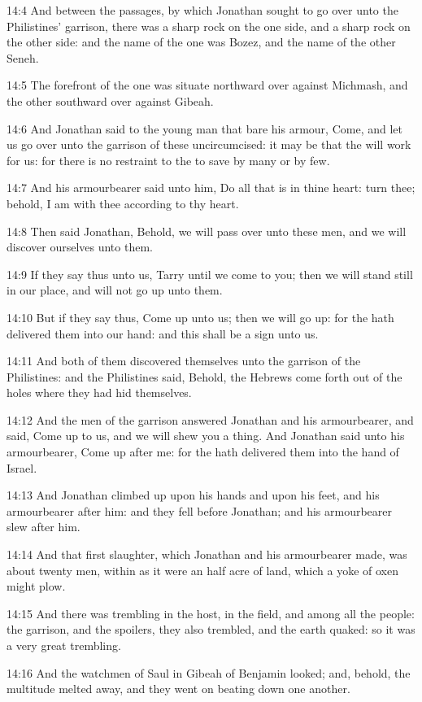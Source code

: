 14:4 And between the passages, by which Jonathan sought to go over
unto the Philistines' garrison, there was a sharp rock on the one
side, and a sharp rock on the other side: and the name of the one was
Bozez, and the name of the other Seneh.

14:5 The forefront of the one was situate northward over against
Michmash, and the other southward over against Gibeah.

14:6 And Jonathan said to the young man that bare his armour, Come,
and let us go over unto the garrison of these uncircumcised: it may be
that the \LORD will work for us: for there is no restraint to the \LORD
to save by many or by few.

14:7 And his armourbearer said unto him, Do all that is in thine
heart: turn thee; behold, I am with thee according to thy heart.

14:8 Then said Jonathan, Behold, we will pass over unto these men, and
we will discover ourselves unto them.

14:9 If they say thus unto us, Tarry until we come to you; then we
will stand still in our place, and will not go up unto them.

14:10 But if they say thus, Come up unto us; then we will go up: for
the \LORD hath delivered them into our hand: and this shall be a sign
unto us.

14:11 And both of them discovered themselves unto the garrison of the
Philistines: and the Philistines said, Behold, the Hebrews come forth
out of the holes where they had hid themselves.

14:12 And the men of the garrison answered Jonathan and his
armourbearer, and said, Come up to us, and we will shew you a thing.
And Jonathan said unto his armourbearer, Come up after me: for the
\LORD hath delivered them into the hand of Israel.

14:13 And Jonathan climbed up upon his hands and upon his feet, and
his armourbearer after him: and they fell before Jonathan; and his
armourbearer slew after him.

14:14 And that first slaughter, which Jonathan and his armourbearer
made, was about twenty men, within as it were an half acre of land,
which a yoke of oxen might plow.

14:15 And there was trembling in the host, in the field, and among all
the people: the garrison, and the spoilers, they also trembled, and
the earth quaked: so it was a very great trembling.

14:16 And the watchmen of Saul in Gibeah of Benjamin looked; and,
behold, the multitude melted away, and they went on beating down one
another.

